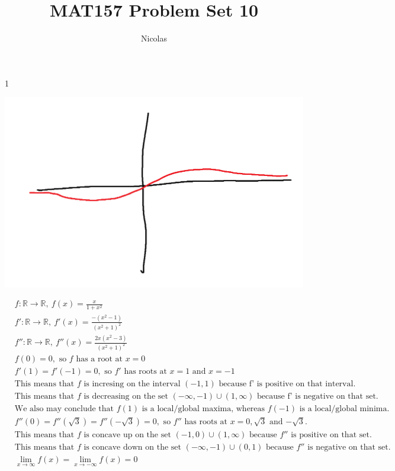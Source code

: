 \documentclass[11pt]{article}
\title{MAT157 Problem Set 10}
\author{Nicolas}
\newcommand{\R}{\mathbb{R}}
\begin{document}
\maketitle
\begin{flushleft}

1


\includegraphics[width=\textwidth]{shittygraph.png}

\begin{align*}
&f:\R \to \R, \ f(x) = \frac{x}{1+x^2} \\
&f': \R \to \R, \ f'(x) = \frac{-(x^2-1)}{(x^2+1)^2} \\
&f'': \R \to \R, \ f''(x) = \frac{2x(x^2-3)}{(x^2+1)^2} \\
&f(0) = 0, \text{ so $f$ has a root at $x = 0$} \\
&f'(1) = f'(-1) = 0, \text{ so $f'$ has roots at $x = 1$ and $x = -1$} \\
&\text{This means that $f$ is incresing on the interval $(-1,1)$ because f' is positive on that interval.} \\
&\text{This means that $f$ is decreasing on the set $(-\infty, -1) \cup(1, \infty)$ because f' is negative on that set.} \\
& \text{We also may conclude that $f(1)$ is a local/global maxima, whereas $f(-1)$ is a local/global minima.} \\
&f''(0) = f''(\sqrt{3}) = f''(-\sqrt{3}) = 0, \text{ so $f''$ has roots at $x = 0, \sqrt{3}$ and $-\sqrt{3}$}. \\
&\text{This means that $f$ is concave up on the set $(-1,0)\cup(1, \infty)$ because $f''$ is positive on that set.} \\
&\text{This means that $f$ is concave down on the set $(-\infty, -1) \cup (0,1)$ because $f''$ is negative on that set.} \\
& \lim_{x \to \infty} f(x) = \lim _{x \to -\infty} f(x) = 0 \\
\end{align*}


\end{flushleft}
\end{document}
